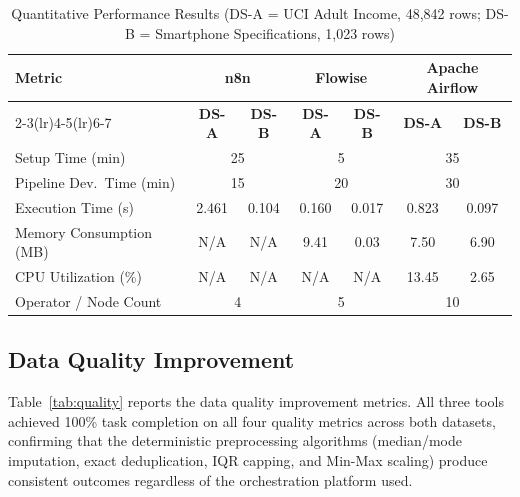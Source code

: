 \documentclass[journal]{IEEEtran}
\begin{document}
\begin{table}[!t]
  \caption{Quantitative Performance Results (DS-A = UCI Adult Income,
    48,842 rows; DS-B = Smartphone Specifications, 1,023 rows)}
  \label{tab:quant}
  \renewcommand{\arraystretch}{1.25}
  \centering
  \small
  \begin{tabular}{@{}lcccccc@{}}
    \toprule
    \multirow{2}{*}{\textbf{Metric}}
      & \multicolumn{2}{c}{\textbf{n8n}}
      & \multicolumn{2}{c}{\textbf{Flowise}}
      & \multicolumn{2}{c}{\textbf{Apache Airflow}} \\
    \cmidrule(lr){2-3}\cmidrule(lr){4-5}\cmidrule(lr){6-7}
      & \textbf{DS-A} & \textbf{DS-B}
      & \textbf{DS-A} & \textbf{DS-B}
      & \textbf{DS-A} & \textbf{DS-B} \\
    \midrule
    Setup Time (min)          & \multicolumn{2}{c}{25}
                              & \multicolumn{2}{c}{5}
                              & \multicolumn{2}{c}{35}           \\
    Pipeline Dev.\ Time (min) & \multicolumn{2}{c}{15}
                              & \multicolumn{2}{c}{20}
                              & \multicolumn{2}{c}{30}           \\
    Execution Time (s)        & 2.461 & 0.104 & 0.160 & 0.017 & 0.823 & 0.097 \\
    Memory Consumption (MB)   & N/A   & N/A   & 9.41  & 0.03  & 7.50  & 6.90  \\
    CPU Utilization (\%)      & N/A   & N/A   & N/A   & N/A   & 13.45 & 2.65  \\
    Operator / Node Count     & \multicolumn{2}{c}{4}
                              & \multicolumn{2}{c}{5}
                              & \multicolumn{2}{c}{10}           \\
    \bottomrule
  \end{tabular}
\end{table}

\subsection{Data Quality Improvement}

Table~\ref{tab:quality} reports the data quality improvement metrics.
All three tools achieved 100\% task completion on all four quality
metrics across both datasets, confirming that the deterministic
preprocessing algorithms (median/mode imputation, exact deduplication,
IQR capping, and Min-Max scaling) produce consistent outcomes regardless
of the orchestration platform used.
\end{document}
